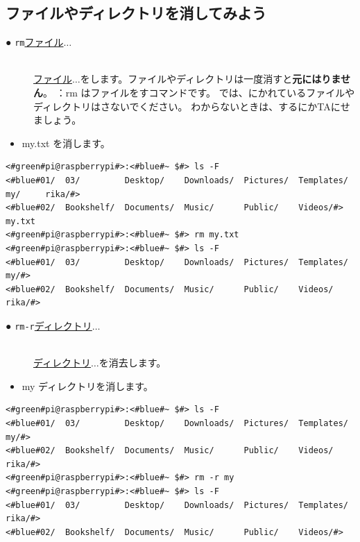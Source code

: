 \documentclass[text03.tex]{subfiles}
\begin{document}
\subsection{ファイルやディレクトリを消してみよう}
\begin{description}
\item[● \texttt{rm}\textvisiblespace \underline{ファイル}$\ldots$]\mbox{}\\
\underline{ファイル}$\ldots$をします。ファイルやディレクトリは一度消すと\textbf{元にはりません}。
：rm はファイルをすコマンドです。
では、にかれているファイルやディレクトリはさないでください。
わからないときは、するにかTAにせましょう。

\end{description}
\begin{itemize}
\item[<例>]my.txt を消します。
\end{itemize}
\begin{lstlisting}[caption=rmの例, label=rm]
<#green#pi@raspberrypi#>:<#blue#~ $#> ls -F
<#blue#01/  03/         Desktop/    Downloads/  Pictures/  Templates/   my/     rika/#>
<#blue#02/  Bookshelf/  Documents/  Music/      Public/    Videos/#>      my.txt
<#green#pi@raspberrypi#>:<#blue#~ $#> rm my.txt
<#green#pi@raspberrypi#>:<#blue#~ $#> ls -F
<#blue#01/  03/         Desktop/    Downloads/  Pictures/  Templates/   my/#>
<#blue#02/  Bookshelf/  Documents/  Music/      Public/    Videos/      rika/#>
\end{lstlisting}
\begin{description}
\item[● \texttt{rm}\textvisiblespace \texttt{-r}\textvisiblespace \underline{ディレクトリ}$\ldots$]\mbox{}\\
\underline{ディレクトリ}$\ldots$を消去します。
\end{description}
\newpage
\begin{itemize}
\item[<例>]my ディレクトリを消します。
\end{itemize}
\begin{lstlisting}[caption=rm -rの例, label=rm-R]
<#green#pi@raspberrypi#>:<#blue#~ $#> ls -F
<#blue#01/  03/         Desktop/    Downloads/  Pictures/  Templates/   my/#>
<#blue#02/  Bookshelf/  Documents/  Music/      Public/    Videos/      rika/#>
<#green#pi@raspberrypi#>:<#blue#~ $#> rm -r my
<#green#pi@raspberrypi#>:<#blue#~ $#> ls -F
<#blue#01/  03/         Desktop/    Downloads/  Pictures/  Templates/   rika/#>
<#blue#02/  Bookshelf/  Documents/  Music/      Public/    Videos/#>
\end{lstlisting}
\end{document}
